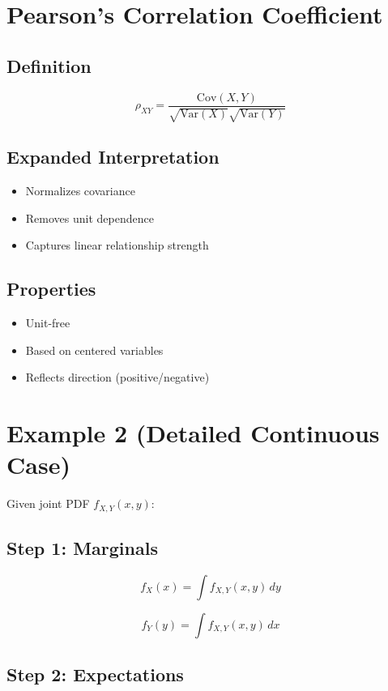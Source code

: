 \documentclass[12pt]{article}
\begin{document}
\section{Pearson’s Correlation Coefficient}

\subsection{Definition}

\[
\rho_{XY} = \frac{\text{Cov}(X,Y)}{\sqrt{\text{Var}(X)} \sqrt{\text{Var}(Y)}}
\]

\subsection{Expanded Interpretation}

\begin{itemize}
    \item Normalizes covariance
    \item Removes unit dependence
    \item Captures linear relationship strength
\end{itemize}

\subsection{Properties}

\begin{itemize}
    \item Unit-free
    \item Based on centered variables
    \item Reflects direction (positive/negative)
\end{itemize}

\section{Example 2 (Detailed Continuous Case)}

Given joint PDF $f_{X,Y}(x,y)$:

\subsection{Step 1: Marginals}

\[
f_X(x) = \int f_{X,Y}(x,y)\,dy
\]

\[
f_Y(y) = \int f_{X,Y}(x,y)\,dx
\]

\subsection{Step 2: Expectations}
\end{document}
